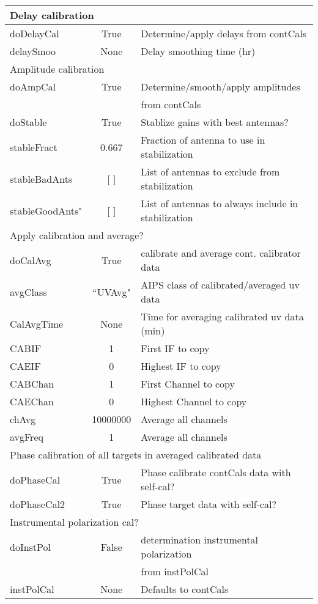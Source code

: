 \documentclass[11pt]{article}
\begin{document}
\begin{center}
\begin{tabular}{|l|c|l|}

\hline
\multicolumn{3}{|l|}{Delay calibration} \\
\hline
doDelayCal & True & Determine/apply delays from contCals \\
delaySmoo & None & Delay smoothing time (hr) \\

\hline
\multicolumn{3}{|l|}{Amplitude calibration} \\
\hline
doAmpCal & True & Determine/smooth/apply amplitudes \\
 & & from contCals \\
doStable        &  True  & Stablize gains with best antennas? \\
stableFract     &  0.667 & Fraction of antenna to use in stabilization \\
stableBadAnts   &  [ ]   & List of antennas to exclude from stabilization \\
stableGoodAnts" &  [ ]   & List of antennas to always include in stabilization \\


\hline
\multicolumn{3}{|l|}{Apply calibration and average?} \\
\hline
doCalAvg & True & calibrate and average cont. calibrator data \\
avgClass & ``UVAvg" & AIPS class of calibrated/averaged uv data \\
CalAvgTime & None & Time for averaging calibrated uv data (min) \\
CABIF & 1 & First IF to copy \\
CAEIF & 0 & Highest IF to copy \\
CABChan & 1 & First Channel to copy \\
CAEChan & 0 & Highest Channel to copy \\
chAvg & 10000000 & Average all channels \\
avgFreq & 1 & Average all channels \\

\hline
\multicolumn{3}{|l|}{Phase calibration of all targets in averaged calibrated
  data} \\
\hline
doPhaseCal & True & Phase calibrate contCals data with self-cal? \\
doPhaseCal2 & True & Phase target data with self-cal? \\

\hline
\multicolumn{3}{|l|}{Instrumental polarization cal?} \\
\hline
doInstPol & False & determination instrumental polarization \\
 & & from instPolCal \\
instPolCal & None & Defaults to contCals \\


\end{tabular}
\end{center}
\end{document}
